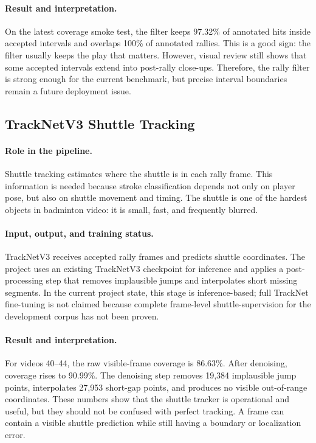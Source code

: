 \documentclass{article}
\begin{document}
\paragraph{Result and interpretation.}
On the latest coverage smoke test, the filter keeps 97.32\% of annotated hits
inside accepted intervals and overlaps 100\% of annotated rallies. This is a
good sign: the filter usually keeps the play that matters. However, visual
review still shows that some accepted intervals extend into post-rally
close-ups. Therefore, the rally filter is strong enough for the current
benchmark, but precise interval boundaries remain a future deployment issue.

\subsection{TrackNetV3 Shuttle Tracking}

\paragraph{Role in the pipeline.}
Shuttle tracking estimates where the shuttle is in each rally frame. This
information is needed because stroke classification depends not only on player
pose, but also on shuttle movement and timing. The shuttle is one of the
hardest objects in badminton video: it is small, fast, and frequently blurred.

\paragraph{Input, output, and training status.}
TrackNetV3 receives accepted rally frames and predicts shuttle coordinates.
The project uses an existing TrackNetV3 checkpoint for inference and applies a
post-processing step that removes implausible jumps and interpolates short
missing segments. In the current project state, this stage is inference-based;
full TrackNet fine-tuning is not claimed because complete frame-level
shuttle-supervision for the development corpus has not been proven.

\paragraph{Result and interpretation.}
For videos 40--44, the raw visible-frame coverage is 86.63\%. After denoising,
coverage rises to 90.99\%. The denoising step removes 19,384 implausible jump
points, interpolates 27,953 short-gap points, and produces no visible
out-of-range coordinates. These numbers show that the shuttle tracker is
operational and useful, but they should not be confused with perfect tracking.
A frame can contain a visible shuttle prediction while still having a boundary
or localization error.
\end{document}

